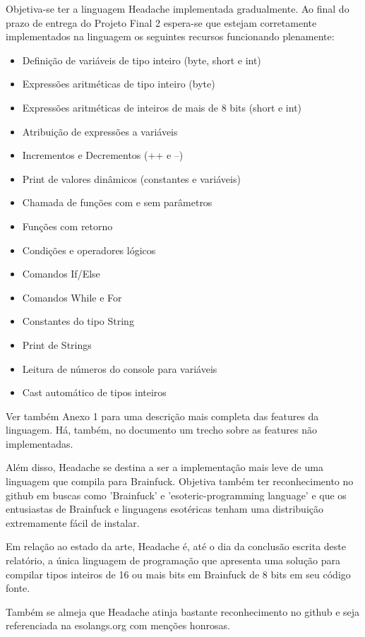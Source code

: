 Objetiva-se ter a linguagem Headache implementada gradualmente. Ao final do prazo de entrega do Projeto Final 2 espera-se que estejam corretamente implementados na linguagem os seguintes recursos funcionando plenamente:

\begin{itemize}
    \item Definição de variáveis de tipo inteiro (byte, short e int)
    \item Expressões aritméticas de tipo inteiro (byte) 
    \item Expressões aritméticas de inteiros de mais de 8 bits (short e int)
    \item Atribuição de expressões a variáveis
    \item Incrementos e Decrementos (++ e --)
    \item Print de valores dinâmicos (constantes e variáveis)
    \item Chamada de funções com e sem parâmetros
    \item Funções com retorno
    \item Condições e operadores lógicos
    \item Comandos If/Else
    \item Comandos While e For
    \item Constantes do tipo String
    \item Print de Strings
    \item Leitura de números do console para variáveis
    \item Cast automático de tipos inteiros
\end{itemize}

Ver também Anexo 1 para uma descrição mais completa das features da linguagem. Há, também, no documento um trecho sobre as features não implementadas.

Além disso, Headache se destina a ser a implementação mais leve de uma linguagem que compila para Brainfuck. Objetiva também ter reconhecimento no github em buscas como 'Brainfuck' e 'esoteric-programming language' e que os entusiastas de Brainfuck e linguagens esotéricas tenham uma distribuição extremamente fácil de instalar. 

Em relação ao estado da arte, Headache é, até o dia da conclusão escrita deste relatório, a única linguagem de programação que apresenta uma solução para compilar tipos inteiros de 16 ou mais bits em Brainfuck de 8 bits em seu código fonte.

Também se almeja que Headache atinja bastante reconhecimento no github e seja referenciada na esolangs.org com menções honrosas.